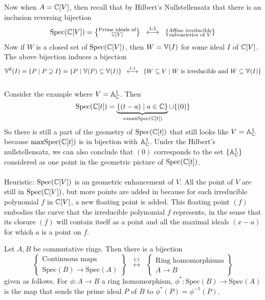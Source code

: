 \documentclass[a4paper]{article}
\begin{document}
Now when $A=\mathbb{C}[V]$, then recall that by Hilbert's Nullstellensatz that there is an inclusion reversing bijection $$\text{Spec}(\mathbb{C}[V])=\left\{\substack{\text{Prime ideals of}\\ \mathbb{C}[V]}\right\}\;\;\overset{\text{1:1}}{\longleftrightarrow}\;\;\left\{\substack{\text{Affine irreducible}\\\text{subvarieties of } V}\right\}$$ Now if $W$ is a closed set of $\text{Spec}(\mathbb{C}[V])$, then $W=\mathbb{V}(I)$ for some ideal $I$ of $\mathbb{C}[V]$. The above bijection induces a bijection $$\mathbb{V}^\text{S}(I)=\left\{P\;|\;P\supseteq I\right\}=\left\{P\;|\;\mathbb{V}(P)\subseteq\mathbb{V}(I)\right\}\;\;\overset{\text{1:1}}{\longleftrightarrow}\;\;\left\{W\subseteq V\;|\;W\text{ is irreducible and }W\subseteq\mathbb{V}(I)\right\}$$~\\

Consider the example where $V=\mathbb{A}_{\mathbb{C}}^1$. Then $$\text{Spec}(\mathbb{C}[t])=\underbrace{\{(t-a)\;|\;a\in\mathbb{C}\}}_{=\text{maxSpec}(\mathbb{C}[t])}\cup\{(0)\}$$ So there is still a part of the geometry of $\text{Spec}(\mathbb{C}[t])$ that still looks like $V=\mathbb{A}_{\mathbb{C}}^1$ because $\text{maxSpec}(\mathbb{C}[t])$ is in bijection with $\mathbb{A}_{\mathbb{C}}^1$. Under the Hilbert's nullstellensatz, we can also conclude that $(0)$ corresponds to the set $\{\mathbb{A}_{\mathbb{C}}^1\}$ considered as one point in the geometric picture of $\text{Spec}(\mathbb{C}[t])$. \\~\\

Heuristic: $\text{Spec}(\mathbb{C}[V])$ is an geometric enhancement of $V$. All the point of $V$ are still in $\text{Spec}(\mathbb{C}[V])$, but more points are added in because for each irreducible polynomial $f$ in $\mathbb{C}[V]$, a new floating point is added. This floating point $(f)$ embodies the curve that the irreducible polynomial $f$ represents, in the sense that its closure $\overline{(f)}$ will contain itself as a point and all the maximal ideals $(x-a)$ for which $a$ is a point on $f$. 

\begin{prp}{}{} Let $A,B$ be commutative rings. Then there is a bijection $$\left\{\substack{\text{Continuous maps}\\\text{Spec}(B)\to\text{Spec}(A)}\right\}\;\;\overset{\text{1:1}}{\longleftrightarrow}\;\;\left\{\substack{\text{Ring homomorphisms}\\ A\to B}\right\}$$ given as follows. For $\phi:A\to B$ a ring homomorphism, $\phi^\ast:\text{Spec}(B)\to\text{Spec}(A)$ is the map that sends the prime ideal $P$ of $B$ to $\phi^\ast(P)=\phi^{-1}(P)$. 
\end{prp}
\end{document}
